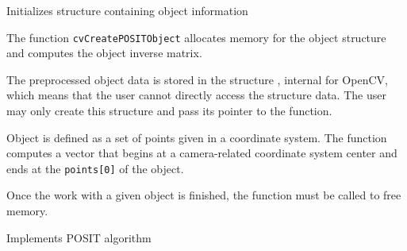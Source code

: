 Initializes structure containing object information


\begin{description}
\end{description}

The function \texttt{cvCreatePOSITObject} allocates memory for the object structure and computes the object inverse matrix.

The preprocessed object data is stored in the structure , internal for OpenCV, which means that the user cannot directly access the structure data. The user may only create this structure and pass its pointer to the function.

Object is defined as a set of points given in a coordinate system. The function  computes a vector that begins at a camera-related coordinate system center and ends at the \texttt{points[0]} of the object.

Once the work with a given object is finished, the function  must be called to free memory.

\label{POSIT}

Implements POSIT algorithm


\begin{description}
\end{description}

